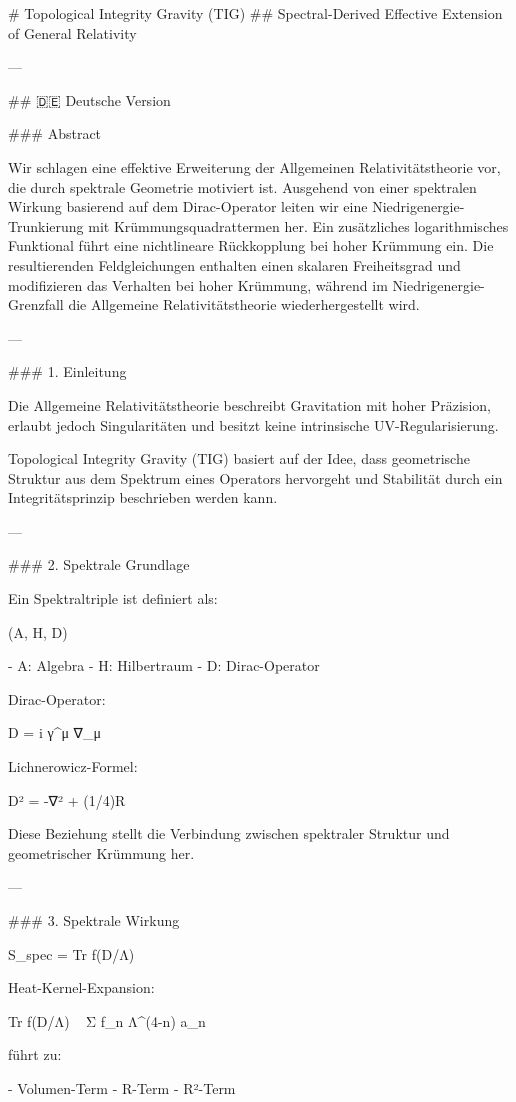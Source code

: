 # Topological Integrity Gravity (TIG)
## Spectral-Derived Effective Extension of General Relativity

---

## 🇩🇪 Deutsche Version

### Abstract

Wir schlagen eine effektive Erweiterung der Allgemeinen Relativitätstheorie vor, die durch spektrale Geometrie motiviert ist. Ausgehend von einer spektralen Wirkung basierend auf dem Dirac-Operator leiten wir eine Niedrigenergie-Trunkierung mit Krümmungsquadrattermen her. Ein zusätzliches logarithmisches Funktional führt eine nichtlineare Rückkopplung bei hoher Krümmung ein. Die resultierenden Feldgleichungen enthalten einen skalaren Freiheitsgrad und modifizieren das Verhalten bei hoher Krümmung, während im Niedrigenergie-Grenzfall die Allgemeine Relativitätstheorie wiederhergestellt wird.

---

### 1. Einleitung

Die Allgemeine Relativitätstheorie beschreibt Gravitation mit hoher Präzision, erlaubt jedoch Singularitäten und besitzt keine intrinsische UV-Regularisierung.

Topological Integrity Gravity (TIG) basiert auf der Idee, dass geometrische Struktur aus dem Spektrum eines Operators hervorgeht und Stabilität durch ein Integritätsprinzip beschrieben werden kann.

---

### 2. Spektrale Grundlage

Ein Spektraltriple ist definiert als:

(A, H, D)

- A: Algebra
- H: Hilbertraum
- D: Dirac-Operator

Dirac-Operator:

D = i γ^μ ∇_μ

Lichnerowicz-Formel:

D² = -∇² + (1/4)R

Diese Beziehung stellt die Verbindung zwischen spektraler Struktur und geometrischer Krümmung her.

---

### 3. Spektrale Wirkung

S_spec = Tr f(D/Λ)

Heat-Kernel-Expansion:

Tr f(D/Λ) ~ Σ f_n Λ^(4-n) a_n

führt zu:

- Volumen-Term
- R-Term
- R²-Term

